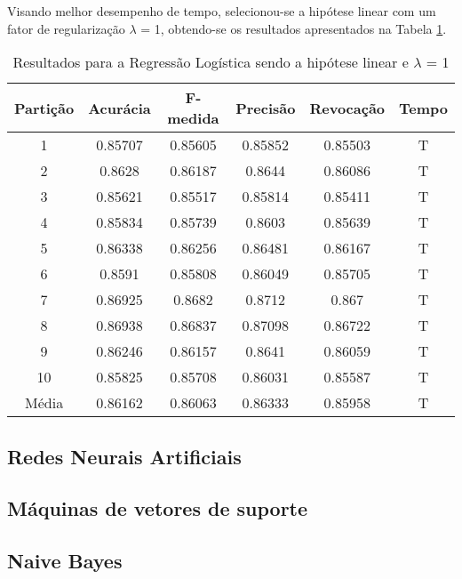 Visando melhor desempenho de tempo, selecionou-se a hipótese linear com um fator de regularização \(\lambda\)  = 1, obtendo-se os resultados apresentados na Tabela \ref{table:resultadosRL}.


\begin{table}[h]
\centering
\caption{Resultados para a Regressão Logística sendo a hipótese linear e \(\lambda\) = 1}
\vspace{0.2cm}
\begin{tabular}{c|c|c|c|c|c}
Partição & Acurácia & F-medida & Precisão & Revocação & Tempo \\
\hline
1  & 0.85707 & 0.85605 & 0.85852 & 0.85503 & T \\      
2  & 0.8628  & 0.86187 & 0.8644  & 0.86086 & T \\      
3  & 0.85621 & 0.85517 & 0.85814 & 0.85411 & T \\      
4  & 0.85834 & 0.85739 & 0.8603  & 0.85639 & T \\      
5  & 0.86338 & 0.86256 & 0.86481 & 0.86167 & T \\      
6  & 0.8591  & 0.85808 & 0.86049 & 0.85705 & T \\      
7  & 0.86925 & 0.8682  & 0.8712  & 0.867   & T \\    
8  & 0.86938 & 0.86837 & 0.87098 & 0.86722 & T \\      
9  & 0.86246 & 0.86157 & 0.8641  & 0.86059 & T \\      
10 & 0.85825 & 0.85708 & 0.86031 & 0.85587 & T \\
\hline
Média & 0.86162 & 0.86063 & 0.86333 & 0.85958 & T 

\end{tabular} 
\label{table:resultadosRL}
\end{table}

\subsection{Redes Neurais Artificiais}

\subsection{Máquinas de vetores de suporte}

\subsection{Naive Bayes}
